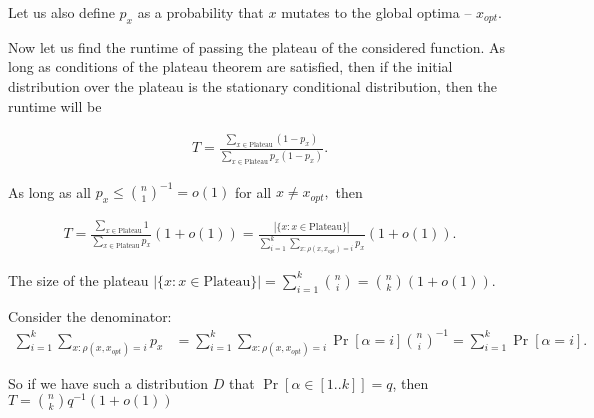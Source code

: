 \documentclass{article}
\begin{document}
Let us also define $p_x$ as a probability that $x$ mutates to the global optima -- $x_{opt}$.

Now let us find the runtime of passing the plateau of the considered function. As long as conditions of the plateau theorem are satisfied, then if the initial distribution over the plateau is the stationary conditional distribution, then the runtime will be

\begin{align*}
  T = \frac{\sum\limits_{x \in \text{Plateau}}(1 - p_x)}{\sum\limits_{x \in \text{Plateau}}p_x(1 - p_x)}.
\end{align*}

As long as all $p_x \le \binom{n}{1}^{-1} = o(1)$ for all $x \ne x_{opt},$ then

\begin{align*}
  T = \frac{\sum\limits_{x \in \text{Plateau}}1}{\sum\limits_{x \in \text{Plateau}}p_x}(1 + o(1)) =
  \frac{|\{x: x \in \text{Plateau}\}|}{\sum\limits_{i = 1}^k \sum\limits_{x: \rho(x, x_{opt}) = i} p_x}(1 + o(1)).
\end{align*}

The size of the plateau $|\{x: x \in \text{Plateau}\}| = \sum\limits_{i = 1}^{k} \binom{n}{i} = \binom{n}{k} (1 + o(1)).$

Consider the denominator:
\begin{align*}
  \sum\limits_{i = 1}^k\sum\limits_{x: \rho(x, x_{opt}) = i} p_x &= \sum\limits_{i = 1}^k\sum\limits_{x: \rho(x, x_{opt}) = i} \Pr[\alpha = i]\binom{n}{i}^{-1} = \sum\limits_{i = 1}^k \Pr[\alpha = i].
\end{align*}

So if we have such a distribution $D$ that $\Pr[\alpha \in  [1..k]] = q$, then $T = \binom{n}{k} q^{-1} (1 + o(1))$
\end{document}
